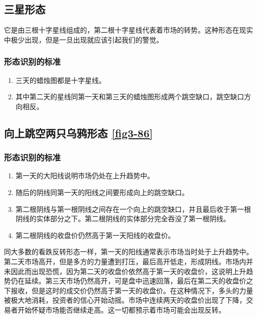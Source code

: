 \subsection{三星形态}
它是由三根十字星线组成的，第二根十字星线代表着市场的转势。这种形态在现实中极少出现，但是一旦出现就应该引起我们的警觉。
\subsubsection*{形态识别的标准}
\begin{enumerate}
    \item 三天的蜡烛图都是十字星线。
    \item 其中第二天的星线同第一天和第三天的蜡烛图形成两个跳空缺口，跳空缺口方向相反。
\end{enumerate}
\subsection{向上跳空两只乌鸦形态 \autoref{fig3-86}}
\subsubsection*{形态识别的标准}
\begin{enumerate}
    \item 第一天的大阳线说明市场仍处在上升趋势中。
    \item 随后的阴线同第一天的阳线之间要形成向上的跳空缺口。
    \item 第二根阴线与第一根阴线之间存在一个向上的跳空缺口，并且最后收于第一根阴线的实体部分之下。第二根阴线的实体部分完全吞没了第一根阴线。
    \item 第二根阴线的收盘价仍然高于第一天阳线的收盘价。
\end{enumerate}

同大多数的看跌反转形态一样，第一天的阳线通常表示市场当时处于上升趋势中。第二天市场高开，但是多方的力量遭到打压，最后高开低走，形成阴线。市场内并未因此而出现恐慌，因为第二天的收盘价依然高于第一天的收盘价，这说明上升趋势仍在延续。第三天市场仍然高开，可是盘中迅速回落，最后在第二天的收盘价之下报收，但是这时的成交价仍然高于第一天的收盘价。在这种情况下，多头的力量被极大地消耗，投资者的信心开始动摇。市场中连续两天的收盘价出现了下降，交易者开始怀疑市场能否继续走高。这一切都预示着市场可能会出现反转。

